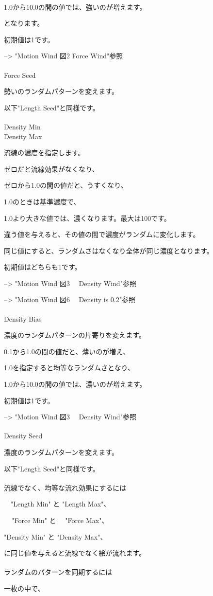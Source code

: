 \documentclass[a4paper,12pt]{article}
\begin{document}
\ \vspace{-0.2em}
\par
1.0から10.0の間の値では、強いのが増えます。\par
となります。\par
初期値は1です。\par
--> "Motion Wind 図2 Force Wind"参照\\
\\
Force Seed\par
勢いのランダムパターンを変えます。\par
以下"Length Seed"と同様です。\\
\\
Density Min\\
Density Max\par
流線の濃度を指定します。\par
ゼロだと流線効果がなくなり、\par
ゼロから1.0の間の値だと、うすくなり、\par
1.0のときは基準濃度で、\par
1.0より大きな値では、濃くなります。最大は100です。\par
違う値を与えると、その値の間で濃度がランダムに変化します。\par
同じ値にすると、ランダムさはなくなり全体が同じ濃度となります。\par
初期値はどちらも1です。\par
--> "Motion Wind 図3 \ \ Density Wind"参照\par
--> "Motion Wind 図6 \ \ Density is 0.2"参照\\
\\
Density Bias\par
濃度のランダムパターンの片寄りを変えます。\par
0.1から1.0の間の値だと、薄いのが増え、\par
1.0を指定すると均等なランダムさとなり、\par
1.0から10.0の間の値では、濃いのが増えます。\par
初期値は1です。\par
--> "Motion Wind 図3 \ \ Density Wind"参照\\
\\
Density Seed\par
濃度のランダムパターンを変えます。\par
以下"Length Seed"と同様です。\\
\\
流線でなく、均等な流れ効果にするには\par
\ \ "Length Min" と "Length Max"、\par
\ \,\, "Force Min" と \ \, "Force Max"、\par
"Density Min" と "Density Max"、\par
に同じ値を与えると流線でなく絵が流れます。\\
\\
ランダムのパターンを同期するには\par
一枚の中で、
\end{document}
